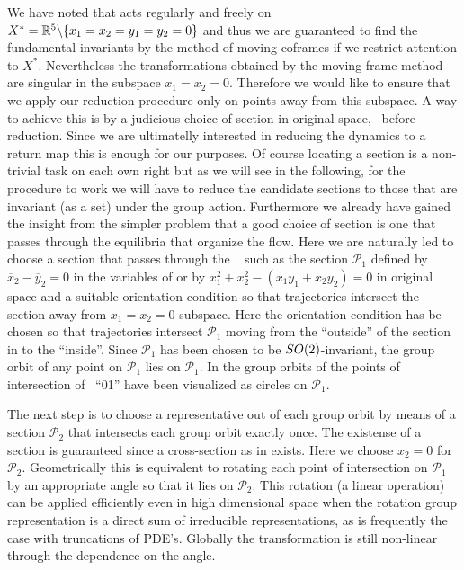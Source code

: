 We have noted that  acts regularly and freely on $X^*=\mathbb{R}^{5}\backslash\{x_1=x_2=y_1=y_2=0\}$ and
thus we are guaranteed to find the fundamental invariants by the method of moving coframes
if we restrict attention to $X^*$. Nevertheless the transformations 
obtained by the moving frame method are singular in the subspace $x_1=x_2=0$. Therefore
we would like to ensure that we apply our reduction procedure only on points away from this
subspace. A way to achieve this is by a judicious choice of \Poincare section in original space,
\ie~before reduction. Since we are ultimatelly interested in reducing the dynamics to a \Poincare
return map this is enough for our purposes. Of course locating a \Poincare section is a non-trivial
task on each own right but as we will see in the following, for the procedure to work we will
have to reduce the candidate \Poincare sections to those that are invariant (as a set) under
the group action. Furthermore we already have gained the insight from the simpler \Le problem
that a good choice of section is one that passes through the equilibria that organize the flow.
Here we are naturally led to choose a section that passes through the \reqv~ such as the
section $\mathcal{P}_1$ defined by $\overline{x}_2-\overline{y}_2=0$ in the variables of
 or by $x_1^2+x_2^2-(x_1 y_1 + x_2 y_2)=0$ in original space and
a suitable orientation condition so that trajectories intersect the section away from
$x_1=x_2=0$ subspace. Here the orientation condition has be chosen so that trajectories intersect
$\mathcal{P}_1$ moving from the ``outside'' of the section in  to the
``inside''.
Since $\mathcal{P}_1$ has been chosen to be $SO(2)$-invariant, the group orbit of any point on
$\mathcal{P}_1$ lies on $\mathcal{P}_1$. In  the group orbits of the points
of intersection of \rpo~``01'' have been visualized as circles on $\mathcal{P}_1$.

The next step is to choose a representative out of each group orbit by means of a section $\mathcal{P}_2$ that intersects each group orbit
exactly once. The existense of a section is guaranteed since a cross-section as in  exists. Here we choose $x_2=0$ for $\mathcal{P}_2$. Geometrically
this is equivalent to rotating each point of intersection on $\mathcal{P}_1$ by
an appropriate angle so that it lies on $\mathcal{P}_2$. This rotation (a linear operation)
can be applied efficiently even in  high dimensional space when the rotation group representation is a direct
sum of irreducible representations, as is frequently the case with truncations of PDE's. 
Globally the transformation is still non-linear through the dependence on the angle.


